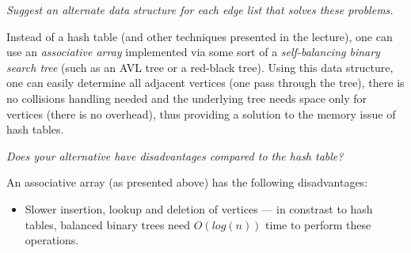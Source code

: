 \textit{Suggest an alternate data structure for each edge list that solves
these problems.}

Instead of a hash table (and other techniques presented in the lecture), one
can use an \emph{associative array} implemented via some sort of a
\emph{self-balancing binary search tree} (such as an AVL tree or a red-black
tree). Using this data structure, one can easily determine all adjacent
vertices (one pass through the tree), there is no collisions handling needed
and the underlying tree needs space only for vertices (there is no overhead),
thus providing a solution to the memory issue of hash tables.

\textit{Does your alternative have disadvantages compared to the hash table?}

An associative array (as presented above) has the following disadvantages:

\begin{itemize}
	\item Slower insertion, lookup and deletion of vertices --- in constrast to
	hash tables, balanced binary trees need $O(log(n))$ time to perform these
	operations.
\end{itemize}

